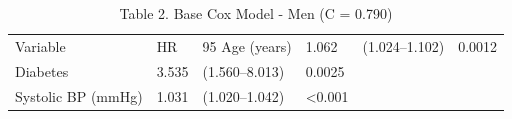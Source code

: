 \begin{table}[ht]
\centering
\caption{Table 2. Base Cox Model - Men (C = 0.790)} 
\begin{tabular}{llll}
  \toprule
Variable & HR & 95%
  \midrule
Age (years) & 1.062 & (1.024–1.102) & 0.0012 \\ 
  Diabetes & 3.535 & (1.560–8.013) & 0.0025 \\ 
  Systolic BP (mmHg) & 1.031 & (1.020–1.042) & <0.001 \\ 
   \bottomrule
\end{tabular}
\end{table}
